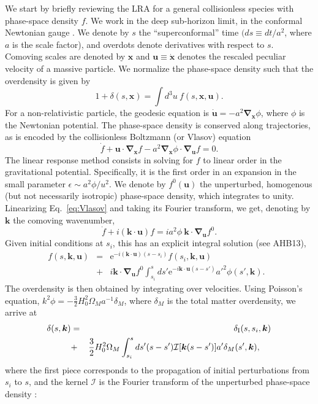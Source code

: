 \documentclass[useAMS, usenatbib]{mnras}
\newcommand{\beq}{\begin{equation}}
\newcommand{\eeq}{\end{equation}}
\newcommand{\barr}{\begin{eqnarray}}
\newcommand{\earr}{\end{eqnarray}}
\newcommand{\rme}{\textrm{e}}
\newcommand{\bs}{\boldsymbol}
\begin{document}
We start by briefly reviewing the LRA for a general collisionless species with phase-space density $f$. We work in the deep sub-horizon limit, in the conformal Newtonian gauge \citep{Ma_1995}. We denote by $s$ the ``superconformal'' time $(ds \equiv dt/a^2$, where $a$ is the scale factor), and overdots denote derivatives with respect to $s$. Comoving scales are denoted by $\bs{x}$ and $\bs{u} \equiv \dot{\bs{x}}$ denotes the rescaled peculiar velocity of a massive particle. We normalize the phase-space density such that the overdensity is given by
\beq
1 + \delta(s, \bs{x}) = \int d^3 u ~ f(s, \bs{x}, \bs{u}).
\eeq
For a non-relativistic particle, the geodesic equation is $\dot{\bs{u}} = - a^2  \bs{\nabla}_{\bs{x}} \phi$, where $\phi$ is the Newtonian potential. The phase-space density is conserved along trajectories, as is encoded by the collisionless Boltzmann (or Vlasov) equation
\beq
\dot{f} + \bs{u} \cdot \bs{\nabla}_{\bs{x}} f - a^2 \bs{\nabla}_{\bs{x}} \phi \cdot \bs{\nabla}_{\bs{u}} f = 0. \label{eq:Vlasov}
\eeq
The linear response method consists in solving for $f$ to linear order in the gravitational potential. Specifically, it is the first order in an expansion in the small parameter $\epsilon \sim a^2 \phi/u^2$. We denote by $f^0(\bs{u})$ the unperturbed, homogenous (but not necessarily isotropic) phase-space density, which integrates to unity. Linearizing Eq.~\eqref{eq:Vlasov} and taking its Fourier transform, we get, denoting by $\bs{k}$ the comoving wavenumber,
\beq
\dot{f} + i (\bs{k} \cdot \bs{u}) f = i a^2 \phi ~ \bs{k} \cdot \bs{\nabla}_{\bs{u}} f^0. \label{eq:Boltz-Fourier}
\eeq
Given initial conditions at $s_i$, this has an explicit integral solution (see AHB13),
\barr
f(s, \bs{k}, \bs{u}) &=& \rme^{- i(\bs{k} \cdot \bs{u}) (s - s_i)} f(s_i, \bs{k}, \bs{u}) \nonumber\\
&+& i \bs{k} \cdot \bs{\nabla}_{\bs{u}} f^0 \int_{s_i}^s d s' \rme^{- i \bs{k} \cdot \bs{u} (s - s')} a'^2 \phi(s', \bs{k}).~~~
\earr
The overdensity is then obtained by integrating over velocities. Using Poisson's equation, $k^2 \phi = - \frac32 H_0^2 \Omega_M a^{-1} \delta_M$, where $\delta_M$ is the total matter overdensity, we arrive at
\barr
\delta(s, \bs{k}) &=& \delta_{\rm I}(s,s_i, \bs{k})\nonumber\\
&+& \frac32 H_0^2 \Omega_M \int_{s_i}^s d s' (s-s') \mathcal{I}[\bs{k}(s-s')] a' \delta_M(s', \bs{k}), ~~~~\label{eq:delta-phi}
\earr
where the first piece corresponds to the propagation of initial perturbations from $s_i$ to $s$, and the kernel $\mathcal{I}$ is the Fourier transform of the unperturbed phase-space density \citep{Brandenberger_1987, Bertschinger_Watts_1988}:
\end{document}
